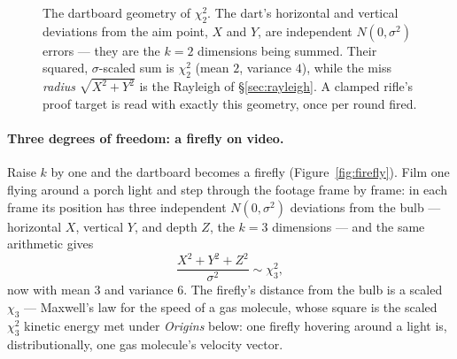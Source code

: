 \documentclass[11pt]{article}
\numberwithin{equation}{section}
\begin{document}
\begin{figure}[htbp]
\centering
{}
\caption{The dartboard geometry of $\chi^2_2$.  The dart's horizontal
and vertical deviations from the aim point, $X$ and $Y$, are
independent $N(0,\sigma^2)$ errors --- they are the $k=2$ dimensions
being summed.  Their squared, $\sigma$-scaled sum is $\chi^2_2$
(mean $2$, variance $4$), while the miss \emph{radius}
$\sqrt{X^2+Y^2}$ is the Rayleigh of \S\ref{sec:rayleigh}.  A clamped
rifle's proof target is read with exactly this geometry, once per
round fired.}
\label{fig:dartboard}
\end{figure}

\paragraph{Three degrees of freedom: a firefly on video.}
Raise $k$ by one and the dartboard becomes a firefly
(Figure~\ref{fig:firefly}).  Film one flying around a porch light and
step through the footage frame by frame: in each frame its position has
three independent $N(0,\sigma^2)$ deviations from the bulb ---
horizontal $X$, vertical $Y$, and depth $Z$, the $k=3$ dimensions ---
and the same arithmetic gives
\[
\frac{X^2+Y^2+Z^2}{\sigma^2}\sim\chi^2_3 ,
\]
now with mean $3$ and variance $6$.  The firefly's distance from the
bulb is a scaled $\chi_3$ --- Maxwell's law for the speed of a gas
molecule, whose square is the scaled $\chi^2_3$ kinetic energy met
under \emph{Origins} below: one firefly hovering around a light is,
distributionally, one gas molecule's velocity vector.
\end{document}
